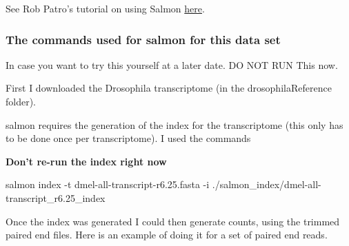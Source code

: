 \documentclass[
]{article}
\newenvironment{Shaded}{\begin{snugshade}}{\end{snugshade}}
\newcommand{\ExtensionTok}[1]{#1}
\newcommand{\NormalTok}[1]{#1}
\newcommand{\VariableTok}[1]{\textcolor[rgb]{0.00,0.00,0.00}{#1}}
\begin{document}
See Rob Patro's tutorial on using Salmon
\href{https://combine-lab.github.io/salmon/}{here}.

\hypertarget{the-commands-used-for-salmon-for-this-data-set}{%
\subsubsection{The commands used for salmon for this data
set}\label{the-commands-used-for-salmon-for-this-data-set}}

In case you want to try this yourself at a later date. DO NOT RUN This
now.

First I downloaded the Drosophila transcriptome (in the
drosophilaReference folder).

salmon requires the generation of the index for the transcriptome (this
only has to be done once per transcriptome). I used the commands

\textbf{Don't re-run the index right now}

\begin{Shaded}
\begin{Highlighting}[]
\ExtensionTok{salmon}\NormalTok{ index -t dmel-all-transcript-r6.25.fasta -i ./salmon_index/dmel-all-transcript_r6.25_index}
\end{Highlighting}
\end{Shaded}

Once the index was generated I could then generate counts, using the
trimmed paired end files. Here is an example of doing it for a set of
paired end reads.

\begin{Shaded}
\end{Shaded}
\end{document}
